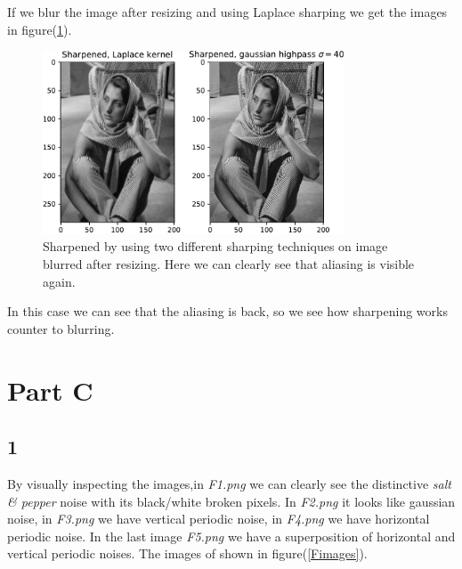 {If we blur the image after resizing and using Laplace sharping we get the images in figure(\ref{sharpened2}).

\begin{figure}[!htb]
    {\centering
        \includegraphics[width=0.80\textwidth]{sharpened2.pdf}
        \caption{Sharpened by using two different sharping techniques on image blurred after resizing. Here we can clearly see that aliasing is visible again.}
        \label{sharpened2}
    \par}
    \end{figure}
In this case we can see that the aliasing is back, so we see how sharpening works counter to blurring.


\section{Part C}
\subsection{1}


By visually inspecting the images,in \emph{F1.png} we can clearly see the distinctive \emph{salt \& pepper} noise with its black/white broken pixels. In \emph{F2.png} it looks like gaussian noise, in \emph{F3.png} we have vertical periodic noise, in \emph{F4.png} we have horizontal periodic noise. In the last image \emph{F5.png} we have a superposition of horizontal and vertical periodic noises. The images of shown in figure(\ref{Fimages}).


}

